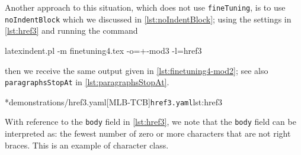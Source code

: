 \begin{example}
	 Another approach to this situation, which does not use \texttt{fineTuning}, is to use \texttt{noIndentBlock}
	 which we discussed in \vref{lst:noIndentBlock};
	 using the settings in \cref{lst:href3} and running the command
	 \begin{commandshell}
latexindent.pl -m finetuning4.tex -o=+-mod3 -l=href3
\end{commandshell}
	 then we receive the same output given in \cref{lst:finetuning4-mod2}; see also \texttt{paragraphsStopAt}
	 in \vref{lst:paragraphsStopAt}.

	 \cmhlistingsfromfile[style=yaml-LST]*{demonstrations/href3.yaml}[MLB-TCB]{\texttt{href3.yaml}}{lst:href3}

	 With reference to the \texttt{body} field in \cref{lst:href3}, we note that the \texttt{body} field can
	 be interpreted as: the fewest number of zero or more characters that are not right braces. This
	 is an example of character class.
 \end{example}

